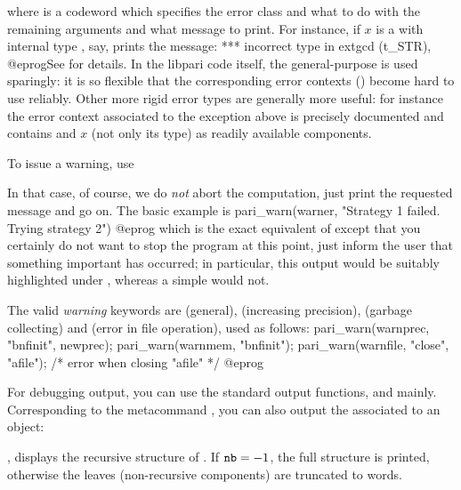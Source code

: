 
\noindent where  is a codeword which specifies the error class
and what to do with the remaining arguments and what message to print.
For instance, if $x$ is a  with internal type , say,
 prints the message:
\bprog
    ***   incorrect type in extgcd (t_STR),
@eprog\noindent See  for details. In the libpari code
itself, the general-purpose  is used sparingly: it is so
flexible that the corresponding error contexts () become hard to
use reliably. Other more rigid error types are generally more useful: for
instance the error context associated to the  exception above is
precisely documented and contains  and $x$ (not only its type)
as readily available components.


\noindent To issue a warning, use

In that case, of course, we do \emph{not} abort the computation, just print
the requested message and go on. The basic example is
%
\bprog
    pari_warn(warner, "Strategy 1 failed. Trying strategy 2")
@eprog\noindent
which is the exact equivalent of  except that
you certainly do not want to stop the program at this point, just inform the
user that something important has occurred; in particular, this output would be
suitably highlighted under , whereas a simple  would not.

The valid \emph{warning} keywords are  (general), 
(increasing precision),  (garbage collecting) and 
(error in file operation), used as follows:
\bprog
    pari_warn(warnprec, "bnfinit", newprec);
    pari_warn(warnmem,  "bnfinit");
    pari_warn(warnfile, "close", "afile");  /* error when closing "afile" */
@eprog

\label{se:dbg_output}

For debugging output, you can use the standard output
functions,  and  mainly. Corresponding to the
 metacommand , you can also output the  associated to an object:

, displays the recursive structure of
. If ${\tt nb} = -1$, the full structure is printed, otherwise
the leaves (non-recursive components) are truncated to  words.

